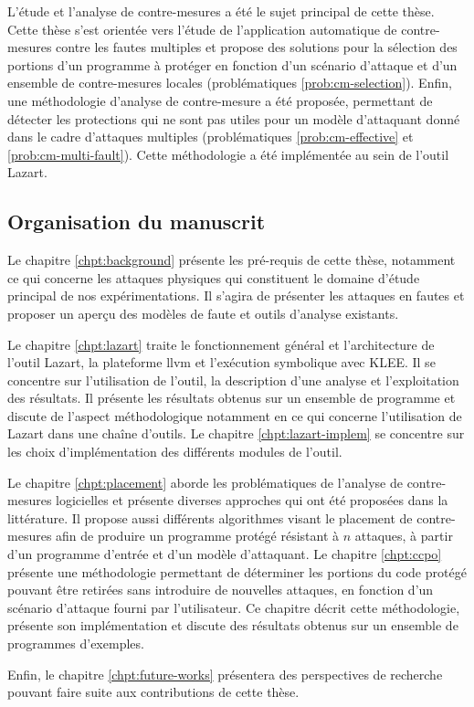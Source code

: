             L'étude et l'analyse de contre-mesures a été le sujet principal de cette thèse.
            Cette thèse s'est orientée vers l'étude de l'application automatique de contre-mesures contre les fautes multiples et propose des solutions pour la sélection des portions d'un programme à protéger en fonction d'un scénario d'attaque et d'un ensemble de contre-mesures locales (problématiques \ref{prob:cm-selection}).
            Enfin, une méthodologie d'analyse de contre-mesure a été proposée, permettant de détecter les protections qui ne sont pas utiles pour un modèle d'attaquant donné dans le cadre d'attaques multiples (problématiques \ref{prob:cm-effective} et \ref{prob:cm-multi-fault}). Cette méthodologie a été implémentée au sein de l'outil Lazart. 
        
        \subsection{Organisation du manuscrit}      
        
            Le chapitre \ref{chpt:background} présente les pré-requis de cette thèse, notamment ce qui concerne les attaques physiques qui constituent le domaine d'étude principal de nos expérimentations. Il s'agira de présenter les attaques en fautes et proposer un aperçu des modèles de faute et outils d'analyse existants.
        
            Le chapitre \ref{chpt:lazart} traite le fonctionnement général et l'architecture de l'outil Lazart, la plateforme \gls{llvm} et l'exécution symbolique avec KLEE. Il se concentre sur l'utilisation de l'outil, la description d'une analyse et l'exploitation des résultats. Il présente les résultats obtenus sur un ensemble de programme et discute de l'aspect méthodologique notamment en ce qui concerne l'utilisation de Lazart dans une chaîne d'outils.
            Le chapitre \ref{chpt:lazart-implem} se concentre sur les choix d'implémentation des différents modules de l'outil.
        
            Le chapitre \ref{chpt:placement} aborde les problématiques de l'analyse de contre-mesures logicielles et présente diverses approches qui ont été proposées dans la littérature.
            Il propose aussi différents algorithmes visant le placement de contre-mesures afin de produire un programme protégé résistant à $n$ attaques, à partir d'un programme d'entrée et d'un modèle d'attaquant.  
            Le chapitre \ref{chpt:ccpo} présente une méthodologie permettant de déterminer les portions du code protégé pouvant être retirées sans introduire de nouvelles attaques, en fonction d'un scénario d'attaque fourni par l'utilisateur. Ce chapitre décrit cette méthodologie, présente son implémentation et discute des résultats obtenus sur un ensemble de programmes d'exemples.
            
            Enfin, le chapitre \ref{chpt:future-works} présentera des perspectives de recherche pouvant faire suite aux contributions de cette thèse.
